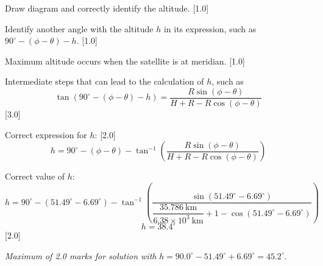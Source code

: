 Draw diagram and correctly identify the altitude. \hfill[1.0]

Identify another angle with the altitude $h$ in its expression, such as
$90^\circ - (\phi - \theta) - h$. \hfill[1.0]

Maximum altitude occurs when the satellite is at meridian. \hfill[1.0]

Intermediate steps that can lead to the calculation of $h$, such as
\[ \tan(90^\circ - (\phi - \theta) - h)
   = \frac{R\sin(\phi - \theta)}{H + R - R\cos(\phi - \theta)} \]
\hfill[3.0]

Correct expression for $h$: \hfill[2.0]
\[ h = 90^\circ - (\phi - \theta)
   - \tan^{-1}\left(\frac{R\sin(\phi - \theta)}
                        {H + R - R\cos(\phi - \theta)}\right) \]

Correct value of $h$:
\[ h = 90^\circ - (51.49^\circ - 6.69^\circ)
   - \tan^{-1}\left(\frac{\sin(51.49^\circ - 6.69^\circ)}
     {\dfrac{35.786\ \mathrm{km}}{6.38\times 10^{3}\ \mathrm{km}}
      + 1 - \cos(51.49^\circ - 6.69^\circ)}\right) \]
\[ h = 38.4^\circ \]
\hfill[2.0]

\emph{Maximum of 2.0 marks for solution with}
$h = 90.0^\circ - 51.49^\circ + 6.69^\circ = 45.2^\circ$.

